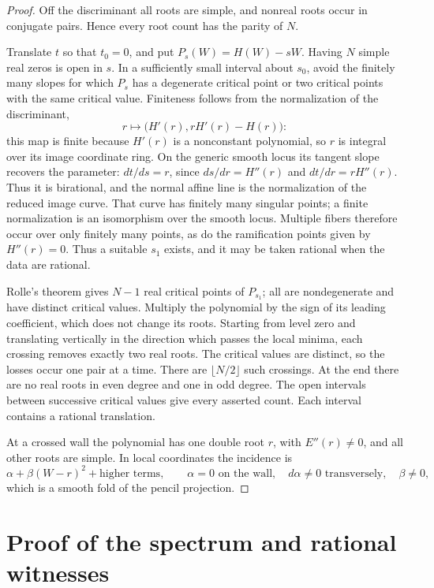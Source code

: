 \documentclass[11pt]{article}
\numberwithin{equation}{section}
\begin{document}
\begin{proof}
Off the discriminant all roots are simple, and nonreal roots occur in
conjugate pairs.  Hence every root count has the parity of \(N\).

Translate \(t\) so that \(t_0=0\), and put \(P_s(W)=H(W)-sW\).
Having \(N\) simple real zeros is open in \(s\).  In a sufficiently small
interval about \(s_0\), avoid the finitely many slopes for which \(P_s\) has
a degenerate critical point or two critical points with the same critical
value.  Finiteness follows from the normalization of the discriminant,
\[
 r\longmapsto\bigl(H'(r),rH'(r)-H(r)\bigr):
\]
this map is finite because \(H'(r)\) is a nonconstant polynomial,
so \(r\) is integral over its image coordinate ring.  On the generic
smooth locus its tangent slope recovers the parameter:
\(dt/ds=r\), since \(ds/dr=H''(r)\) and \(dt/dr=rH''(r)\).
Thus it is birational, and the normal affine line is the normalization
of the reduced image curve.  That curve has finitely many singular
points; a finite normalization is an isomorphism over the smooth locus.
Multiple fibers therefore occur over only finitely many points, as do
the ramification points given by \(H''(r)=0\).  Thus a suitable \(s_1\) exists, and it may be taken rational when
the data are rational.

Rolle's theorem gives \(N-1\) real critical points of \(P_{s_1}\); all are
nondegenerate and have distinct critical values.  Multiply the polynomial by
the sign of its leading coefficient, which does not change its roots.
Starting from level zero and translating vertically in the direction which
passes the local minima, each crossing removes exactly two real roots.
The critical values are distinct, so the losses occur one pair at a time.
There are \(\lfloor N/2\rfloor\) such crossings.  At the end there are no
real roots in even degree and one in odd degree.  The open intervals between
successive critical values give every asserted count.  Each interval
contains a rational translation.

At a crossed wall the polynomial has one double root \(r\), with
\(E''(r)\neq0\), and all other roots are simple.  In local coordinates the
incidence is
\[
 \alpha+\beta(W-r)^2+\text{higher terms},\qquad
 \alpha=0\text{ on the wall},\quad d\alpha\neq0\text{ transversely},
 \quad\beta\neq0,
\]
which is a smooth fold of the pencil projection.
\end{proof}

\section{Proof of the spectrum and rational witnesses}
\end{document}
